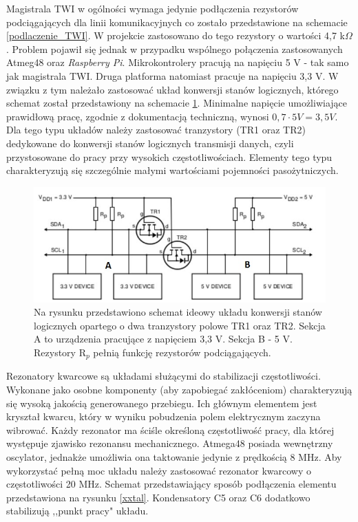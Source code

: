   Magistrala TWI w ogólności wymaga jedynie podłączenia rezystorów podciągających dla linii komunikacyjnych co zostało przedstawione na schemacie \ref{podlaczenie_TWI}. W projekcie zastosowano do tego rezystory o wartości 4,7 k$\Omega$. Problem pojawił się jednak w przypadku wspólnego połączenia zastosowanych Atmeg48 oraz \textit{Raspberry Pi}. Mikrokontrolery pracują na napięciu 5 V - tak samo jak magistrala TWI. Druga platforma natomiast pracuje na napięciu 3,3 V. W związku z tym należało zastosować układ konwersji stanów logicznych, którego schemat został przedstawiony na schemacie \ref{konw_sch}. Minimalne napięcie umożliwiające prawidłową pracę, zgodnie z dokumentacją techniczną, wynosi $0,7\cdot 5V = 3,5 V$. Dla tego typu układów należy zastosować tranzystory (TR1 oraz TR2) dedykowane do konwersji stanów logicznych transmisji danych, czyli przystosowane do pracy przy wysokich częstotliwościach. Elementy tego typu charakteryzują się szczególnie małymi wartościami pojemności pasożytniczych.
  
\begin{figure}[H]
    \begin{center}
      \includegraphics[scale=0.40]{imgs/konwersja.jpg}
 	\caption[Konwersja stanów logicznych.]{\small{Na rysunku przedstawiono schemat ideowy układu konwersji stanów logicznych opartego o dwa tranzystory polowe TR1 oraz TR2. Sekcja A to urządzenia pracujące z napięciem 3,3 V. Sekcja B - 5 V. Rezystory R$_p$ pełnią funkcję rezystorów podciągających.}\footnotemark}
	\label{konw_sch}
    \end{center}
  \end{figure}  
  	  
  Rezonatory kwarcowe są układami służącymi do stabilizacji częstotliwości. Wykonane jako osobne komponenty (aby zapobiegać zakłóceniom) charakteryzują się wysoką jakością generowanego przebiegu. Ich głównym elementem jest kryształ kwarcu, który w wyniku pobudzenia polem elektrycznym zaczyna wibrować. Każdy rezonator ma ściśle określoną częstotliwość pracy, dla której występuje zjawisko rezonansu mechanicznego.  Atmega48 posiada wewnętrzny oscylator, jednakże umożliwia ona taktowanie jedynie z prędkością 8 MHz. Aby wykorzystać pełną moc układu należy zastosować rezonator kwarcowy o częstotliwości 20 MHz. Schemat przedstawiający sposób podłączenia elementu przedstawiona na rysunku \ref{xxtal}. Kondensatory C5 oraz C6 dodatkowo stabilizują ,,punkt pracy" układu. 
  
